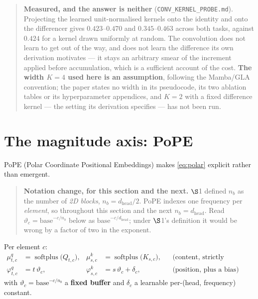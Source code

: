 \documentclass[11pt]{article}
\newcommand{\hd}{d_{\mathrm{head}}}
\newcommand{\nb}{n_b}
\DeclareMathOperator{\softplus}{softplus}
\begin{document}
\begin{quote}\small
\textbf{Measured, and the answer is neither} (\texttt{CONV\_KERNEL\_PROBE.md}).
Projecting the learned unit-normalised kernels onto the identity and onto the
differencer gives $0.423$--$0.470$ and $0.345$--$0.463$ across both tasks, against
$0.424$ for a kernel drawn uniformly at random. The convolution does not learn to
get out of the way, and does not learn the difference its own derivation motivates
--- it stays an arbitrary smear of the increment applied before accumulation, which
is a sufficient account of the cost. \textbf{The width $K=4$ used here is an
assumption}, following the Mamba/GLA convention; the paper states no width in its
pseudocode, its two ablation tables or its hyperparameter appendices, and $K=2$
with a fixed difference kernel --- the setting its derivation specifies --- has not
been run.
\end{quote}

\section{The magnitude axis: PoPE}
\label{sec:pope}

PoPE (Polar Coordinate Positional Embeddings) makes \eqref{eq:polar} explicit
rather than emergent.

\begin{quote}\small
\textbf{Notation change, for this section and the next.} $\S$1 defined $\nb$ as the number of
\emph{2D blocks}, $\nb = \hd/2$. PoPE indexes one frequency per \emph{element}, so
throughout this section and the next $\nb = \hd$. Read $\vartheta_c =
\text{base}^{-c/\nb}$ below as $\text{base}^{-c/\hd}$; under $\S$1's definition it
would be wrong by a factor of two in the exponent.
\end{quote}

\noindent Per element $c$:
\begin{align}
  \mu^q_{t,c} &= \softplus\!\big(Q_{t,c}\big), &
  \mu^k_{s,c} &= \softplus\!\big(K_{s,c}\big), &&\text{(content, strictly positive)}\\
  \varphi^q_{t,c} &= t\,\vartheta_c, &
  \varphi^k_{s,c} &= s\,\vartheta_c + \delta_c, &&\text{(position, plus a bias)}
\end{align}
with $\vartheta_c = \text{base}^{-c/\nb}$ a \textbf{fixed buffer} and
$\delta_c$ a learnable per-(head, frequency) constant.
\end{document}
